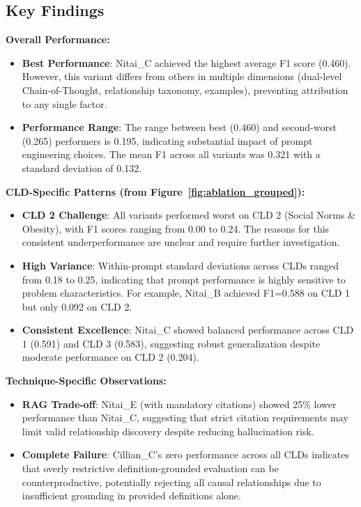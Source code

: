 \subsection{Key Findings}

\textbf{Overall Performance:}
\begin{itemize}
    \item \textbf{Best Performance}: Nitai\_C achieved the highest average F1 score (0.460). However, this variant differs from others in multiple dimensions (dual-level Chain-of-Thought, relationship taxonomy, examples), preventing attribution to any single factor.
    
    \item \textbf{Performance Range}: The range between best (0.460) and second-worst (0.265) performers is 0.195, indicating substantial impact of prompt engineering choices. The mean F1 across all variants was 0.321 with a standard deviation of 0.132.
\end{itemize}

\textbf{CLD-Specific Patterns (from Figure~\ref{fig:ablation_grouped}):}
\begin{itemize}
    \item \textbf{CLD 2 Challenge}: All variants performed worst on CLD 2 (Social Norms \& Obesity), with F1 scores ranging from 0.00 to 0.24. The reasons for this consistent underperformance are unclear and require further investigation.
    
    \item \textbf{High Variance}: Within-prompt standard deviations across CLDs ranged from 0.18 to 0.25, indicating that prompt performance is highly sensitive to problem characteristics. For example, Nitai\_B achieved F1=0.588 on CLD 1 but only 0.092 on CLD 2.
    
    \item \textbf{Consistent Excellence}: Nitai\_C showed balanced performance across CLD 1 (0.591) and CLD 3 (0.583), suggesting robust generalization despite moderate performance on CLD 2 (0.204).
\end{itemize}

\textbf{Technique-Specific Observations:}
\begin{itemize}
    \item \textbf{RAG Trade-off}: Nitai\_E (with mandatory citations) showed 25\% lower performance than Nitai\_C, suggesting that strict citation requirements may limit valid relationship discovery despite reducing hallucination risk.
    
    \item \textbf{Complete Failure}: Cillian\_C's zero performance across all CLDs indicates that overly restrictive definition-grounded evaluation can be counterproductive, potentially rejecting all causal relationships due to insufficient grounding in provided definitions alone.
\end{itemize}

